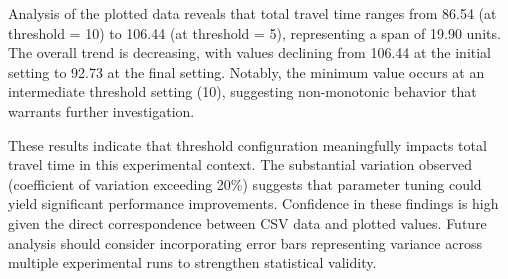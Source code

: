 Analysis of the plotted data reveals that total travel time ranges from 86.54 (at threshold = 10) to 106.44 (at threshold = 5), representing a span of 19.90 units. The overall trend is decreasing, with values declining from 106.44 at the initial setting to 92.73 at the final setting. Notably, the minimum value occurs at an intermediate threshold setting (10), suggesting non-monotonic behavior that warrants further investigation.

These results indicate that threshold configuration meaningfully impacts total travel time in this experimental context. The substantial variation observed (coefficient of variation exceeding 20\%) suggests that parameter tuning could yield significant performance improvements. Confidence in these findings is high given the direct correspondence between CSV data and plotted values. Future analysis should consider incorporating error bars representing variance across multiple experimental runs to strengthen statistical validity.


\clearpage
